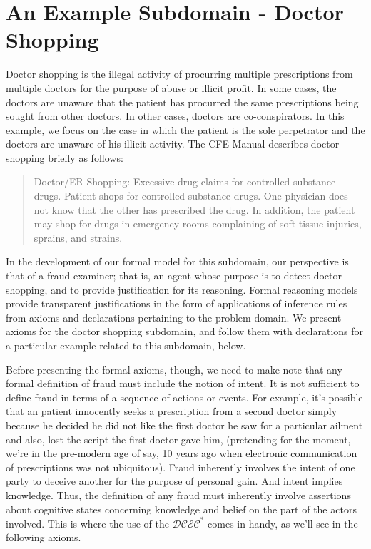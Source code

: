 \section{An Example Subdomain - Doctor Shopping}

Doctor shopping is the illegal activity of procurring multiple prescriptions from multiple doctors for the purpose of abuse or illicit profit.  In some cases, the doctors are unaware that the patient has procurred the same prescriptions being sought from other doctors.  In other cases, doctors are co-conspirators.  In this example, we focus on the case in which the patient is the sole perpetrator and the doctors are unaware of his illicit activity.  The CFE Manual describes doctor shopping briefly as follows:

\blockquote{Doctor/ER Shopping: 
Excessive drug claims for controlled substance drugs. Patient shops for controlled 
substance drugs. One physician does not know that the other has prescribed the drug. In 
addition, the patient may shop for drugs in emergency rooms complaining of soft tissue 
injuries, sprains, and strains.}

In the development of our formal model for this subdomain, our perspective is that of a fraud examiner; that is, an agent whose purpose is to detect doctor shopping, and to provide justification for its reasoning.  Formal reasoning models provide transparent justifications in the form of applications of inference rules from axioms and declarations pertaining to the problem domain.  We present axioms for the doctor shopping subdomain, and follow them with declarations for a particular example related to this subdomain, below.

Before presenting the formal axioms, though, we need to make note that any formal definition of fraud must include the notion of intent.  It is not sufficient to define fraud in terms of a sequence of actions or events.  For example, it's possible that an patient innocently seeks a prescription from a second doctor simply because he decided he did not like the first doctor he saw for a particular ailment and also, lost the script the first doctor gave him, (pretending for the moment, we're in the pre-modern age of say, 10 years ago when electronic communication of prescriptions was not ubiquitous).  Fraud inherently involves the intent of one party to deceive another for the purpose of personal gain.  And intent implies knowledge.  Thus, the definition of any fraud must inherently involve assertions about cognitive states concerning knowledge and belief on the part of the actors involved.  This is where the use of the $\mathcal{DCEC}^\ast$ comes in handy, as we'll see in the following axioms.

